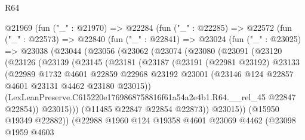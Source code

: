 \begin{lexlean}{R64}
\begin{coremodule}
        @21969
          (fun ("_" : @21970) =>
          @22284
            (fun ("_" : @22285) =>
            @22572
              (fun ("_" : @22573) =>
              @22840
                (fun ("_" : @22841) =>
                @23024
                  (fun ("_" : @23025) =>
                  @23038
                    (@23044
                      (@23056
                        (@23062
                          (@23074
                            (@23080
                              (@23091
                                (@23120
                                  (@23126
                                    (@23139
                                      (@23145
                                        (@23181
                                          (@23187
                                            (@23191
                                              (@22981 @23192)
                                              @23133
                                              (@22989
                                                @1732
                                                @4601
                                                @22859
                                                @22968
                                                @23192
                                                @23001
                                                (@23146
                                                  @124
                                                  @22857
                                                  @4601
                                                  @23131
                                                  @4462
                                                  @23180
                                                  @23015))
                                              (LexLeanPreserve.C615220e1769868758816f61a54a2e4b1.R64.__rel_45
                                                @22847
                                                @22854))
                                            @23015)))
                                      (@11485 @22847 @22854 @22873))
                                    @23015))
                                (@15950 @19349 @22882))
                              (@22988
                                @1960
                                @124
                                @19358
                                @4601
                                @23069
                                @4462
                                (@23098
                                  @1959
                                  @4603

\end{coremodule}
\end{lexlean}
